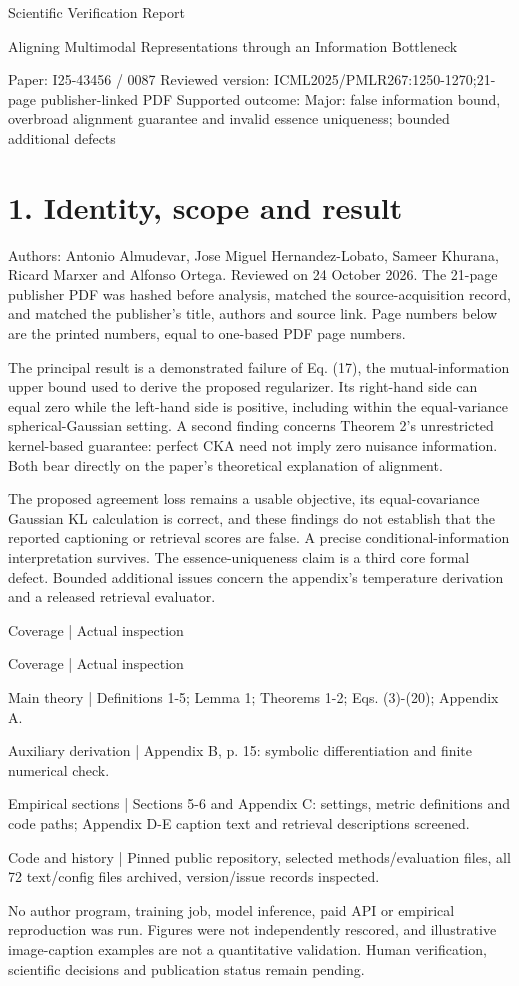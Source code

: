 \documentclass[10pt]{article}
\begin{document}
Scientific Verification Report\par
Aligning Multimodal Representations through an Information Bottleneck\par
Paper: I25-43456 / 0087
Reviewed version: ICML2025/PMLR267:1250-1270;21-page publisher-linked PDF
Supported outcome: Major: false information bound, overbroad alignment guarantee and invalid essence uniqueness; bounded additional defects\par
\section*{1. Identity, scope and result}
Authors: Antonio Almudevar, Jose Miguel Hernandez-Lobato, Sameer Khurana, Ricard Marxer and Alfonso Ortega. Reviewed on 24 October 2026. The 21-page publisher PDF was hashed before analysis, matched the source-acquisition record, and matched the publisher’s title, authors and source link. Page numbers below are the printed numbers, equal to one-based PDF page numbers.\par
The principal result is a demonstrated failure of Eq. (17), the mutual-information upper bound used to derive the proposed regularizer. Its right-hand side can equal zero while the left-hand side is positive, including within the equal-variance spherical-Gaussian setting. A second finding concerns Theorem 2’s unrestricted kernel-based guarantee: perfect CKA need not imply zero nuisance information. Both bear directly on the paper’s theoretical explanation of alignment.\par
The proposed agreement loss remains a usable objective, its equal-covariance Gaussian KL calculation is correct, and these findings do not establish that the reported captioning or retrieval scores are false. A precise conditional-information interpretation survives. The essence-uniqueness claim is a third core formal defect. Bounded additional issues concern the appendix’s temperature derivation and a released retrieval evaluator.\par
Coverage | Actual inspection\par
Coverage | Actual inspection\par
Main theory | Definitions 1-5; Lemma 1; Theorems 1-2; Eqs. (3)-(20); Appendix A.\par
Auxiliary derivation | Appendix B, p. 15: symbolic differentiation and finite numerical check.\par
Empirical sections | Sections 5-6 and Appendix C: settings, metric definitions and code paths; Appendix D-E caption text and retrieval descriptions screened.\par
Code and history | Pinned public repository, selected methods/evaluation files, all 72 text/config files archived, version/issue records inspected.\par
No author program, training job, model inference, paid API or empirical reproduction was run. Figures were not independently rescored, and illustrative image-caption examples are not a quantitative validation. Human verification, scientific decisions and publication status remain pending.\par
\end{document}
